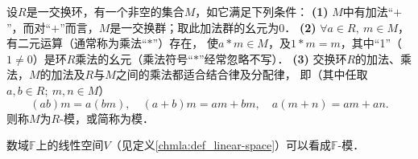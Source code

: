 \begin{definition}\label{chtop:def_module}
    设$R$是一交换环，有一个非空的集合$M$，如它满足下列条件：    
    {\bfseries (1)} $M$中有加法“$+$”，而对“$+$”而言，$M$是一交换群；取此加法群的幺元为$0$．    
    {\bfseries (2)} $\forall a\in R,\ m\in M$，有二元运算（通常称为乘法“$*$”）存在，
    使$a*m\in M$，及$1*m=m$，其中“1”（$1\neq 0$）是环$R$乘法的幺元（乘法符号“$*$”经常忽略不写）．    
    {\bfseries (3)} 交换环$R$的加法、乘法，$M$的加法及$R$与$M$之间的乘法都适合结合律及分配律，
    即（其中任取$a,b\in R;\ m,n\in M$）
    \begin{equation*}
        (a b ) m = a (b m), \quad (a + b)m=a m+ b m, \quad
        a(m+n) = a m + a n.
    \end{equation*}
    则称$M$为$R$-{\heiti 模}，或简称为{\heiti 模}．
\end{definition}

\begin{example}\label{chtop:exm_VM}
    数域$\mathbb{F}$上的线性空间$V$（见定义\ref{chmla:def_linear-space}）可以看成$\mathbb{F}$-模．
\end{example}




